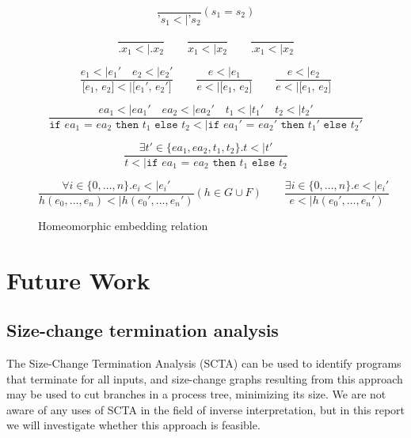 \documentclass[10pt]{../sigplanconf}
\newcommand{\nfrac}[2]{\frac{\displaystyle{#1}}{\displaystyle{#2}}}
\newcommand{\tagsc}[1]{\tag{\scshape #1}}
\begin{document}
\begin{figure}\centering
  \begin{equation}
    \nfrac{
    }{
      \texttt{'}s_1 <| \texttt{'}s_2
    } (s_1 = s_2) \tagsc{Atoms}
  \end{equation}

  \begin{equation}
    \nfrac{
    }{
      \texttt{.}x_1 <| \texttt{.}x_2
    }
    \qquad
    \nfrac{
    }{
      x_1 <| x_2
    }
    \qquad
    \nfrac{
    }{
      \texttt{.}x_1 <| x_2
    } \tagsc{Variables}
  \end{equation}

  \begin{equation}
    \nfrac{
      e_1 <| e_1'\quad e_2 <| e_2'
    }{
      \texttt{[$e_1$, $e_2$]} <| \texttt{[$e_1'$, $e_2'$]}
    }
    \qquad
    \nfrac{
      e <| e_1
    }{
      e <| \texttt{[$e_1$, $e_2$]}
    }
    \qquad
    \nfrac{
      e <| e_2
    }{
      e <| \texttt{[$e_1$, $e_2$]}
    }
    \tagsc{Cons}
  \end{equation}

  \begin{equation}
    \nfrac{
      ea_1 <| ea_1' \quad ea_2 <| ea_2' \quad t_1 <| t_1' \quad t_2 <| t_2'
    }{
      \texttt{if $ea_1$ = $ea_2$ then $t_1$ else $t_2$} <| \texttt{if $ea_1'$ = $ea_2'$ then $t_1'$ else $t_2'$}
    } \tagsc{If-A}
  \end{equation}

  \begin{equation}
    \nfrac{
      \exists t' \in \{ea_1, ea_2, t_1, t_2\}. t <| t'
    }{
      t <| \texttt{if $ea_1$ = $ea_2$ then $t_1$ else $t_2$}
    } \tagsc{If-B}
  \end{equation}

\begin{equation}
  \nfrac{
    \forall i \in \{0, \ldots, n\}. e_i <| e_i'
  }{
    h(e_0, \ldots, e_n) <| h(e_0', \ldots, e_n')
  } (h \in G \cup F)
  \qquad
  \nfrac{
    \exists i \in \{0, \ldots, n\}. e <| e_i'
  }{
    e <| h(e_0', \ldots, e_n')
  }
 \tagsc{Call}
\end{equation}

\caption{Homeomorphic embedding relation}
\label{fig:embedding}
\end{figure}


\section{Future Work}
\subsection{Size-change termination analysis}
  The Size-Change Termination Analysis (SCTA)\cite{lee2001size} can be
  used to identify programs that terminate for all inputs, and
  size-change graphs resulting from this approach may be used to cut
  branches in a process tree, minimizing its size. We are not aware of
  any uses of SCTA in the field of inverse interpretation, but in this
  report we will investigate whether this approach is feasible.






\end{document}
